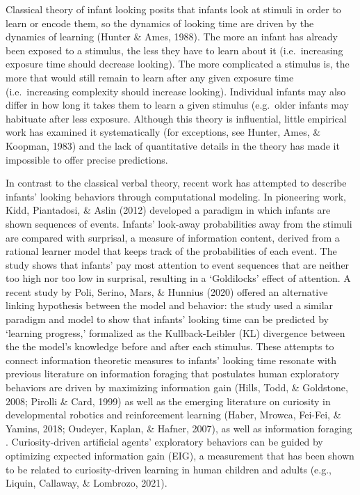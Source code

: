 \documentclass[10pt, letterpaper]{article}
\begin{document}
Classical theory of infant looking posits that infants look at stimuli
in order to learn or encode them, so the dynamics of looking time are
driven by the dynamics of learning (Hunter \& Ames, 1988). The more an
infant has already been exposed to a stimulus, the less they have to
learn about it (i.e.~increasing exposure time should decrease looking).
The more complicated a stimulus is, the more that would still remain to
learn after any given exposure time (i.e.~increasing complexity should
increase looking). Individual infants may also differ in how long it
takes them to learn a given stimulus (e.g.~older infants may habituate
after less exposure. Although this theory is influential, little
empirical work has examined it systematically (for exceptions, see
Hunter, Ames, \& Koopman, 1983) and the lack of quantitative details in
the theory has made it impossible to offer precise predictions.

In contrast to the classical verbal theory, recent work has attempted to
describe infants' looking behaviors through computational modeling. In
pioneering work, Kidd, Piantadosi, \& Aslin (2012) developed a paradigm
in which infants are shown sequences of events. Infants' look-away
probabilities away from the stimuli are compared with surprisal, a
measure of information content, derived from a rational learner model
that keeps track of the probabilities of each event. The study shows
that infants' pay most attention to event sequences that are neither too
high nor too low in surprisal, resulting in a `Goldilocks' effect of
attention. A recent study by Poli, Serino, Mars, \& Hunnius (2020)
offered an alternative linking hypothesis between the model and
behavior: the study used a similar paradigm and model to show that
infants' looking time can be predicted by `learning progress,'
formalized as the Kullback-Leibler (KL) divergence between the the
model's knowledge before and after each stimulus. These attempts to
connect information theoretic measures to infants' looking time resonate
with previous literature on information foraging that postulates human
exploratory behaviors are driven by maximizing information gain (Hills,
Todd, \& Goldstone, 2008; Pirolli \& Card, 1999) as well as the emerging
literature on curiosity in developmental robotics and reinforcement
learning (Haber, Mrowca, Fei-Fei, \& Yamins, 2018; Oudeyer, Kaplan, \&
Hafner, 2007), as well as information foraging . Curiosity-driven
artificial agents' exploratory behaviors can be guided by optimizing
expected information gain (EIG), a measurement that has been shown to be
related to curiosity-driven learning in human children and adults (e.g.,
Liquin, Callaway, \& Lombrozo, 2021).
\end{document}
